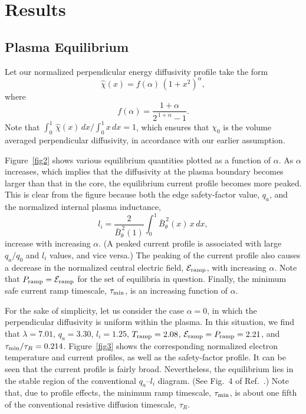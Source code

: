 \documentclass[12pt,prb,aps]{revtex4-1}
\begin{document}
\section{Results}
\subsection{Plasma Equilibrium}
Let our normalized perpendicular energy diffusivity profile take the form
\begin{equation}
\hat{\chi}(x) = f(\alpha)\,(1+x^2)^\alpha,
\end{equation}
where
\begin{equation}
f(\alpha) = \frac{1+\alpha}{2^{\,1+\alpha}-1}.
\end{equation}
Note that $\int_0^1\,\hat{\chi}(x)\,dx/\int_0^1x\,dx=1$, which ensures that $\chi_0$ is the volume averaged perpendicular diffusivity, in accordance with our earlier assumption. 

Figure~\ref{fig2} shows various equilibrium quantities plotted as a function of $\alpha$. As $\alpha$ increases, which implies that the diffusivity at the plasma
boundary becomes larger than that in the core, the equilibrium current profile becomes more peaked. This is clear from the figure because both the edge safety-factor
value, $q_a$, and the normalized internal plasma inductance,\cite{cheng}
\begin{equation}
l_i= \frac{2}{\bar{B}_\theta^{\,2}(1)}\int_0^1\bar{B}_\theta^{\,2}(x)\,x\,dx,
\end{equation}
increase with increasing $\alpha$. (A peaked current profile is associated with  large $q_a/q_0$ and $l_i$ values, and vice versa.\cite{wesson,book}) The peaking of the current profile also causes a decrease in the normalized central electric field, ${\cal E}_{\rm ramp}$,  with increasing $\alpha$. 
Note that $P_{\rm ramp}= {\cal E}_{\rm ramp}$ for the set of equilibria in question. Finally, the minimum safe current ramp timescale, $\tau_{\rm min}$,  is an increasing function of $\alpha$. 

For the sake of simplicity, let us consider the case $\alpha=0$, in which the perpendicular diffusivity is uniform within the plasma. In this situation,
we find that 
$\lambda =  7.01$,  $q_a    =  3.30$,   $l_i   =  1.25$, 
$T_{\rm ramp} =  2.08$,  ${\cal E}_{\rm ramp}=P_{\rm ramp}  =  2.21$, and $\tau_{\rm min}/\tau_R =  0.214$. 
Figure~\ref{fig3} shows the corresponding normalized electron temperature and current profiles, as well as the safety-factor profile. 
It can be seen that the current profile is fairly broad. Nevertheless, the equilibrium lies in the stable region of the
conventional $q_a$--$l_i$ diagram. (See Fig.~4 of Ref.~.) Note that, due to profile effects,  the minimum ramp timescale,
$\tau_{\rm min}$,  is about one fifth of the conventional
resistive diffusion timescale, $\tau_R$. 
\end{document}
